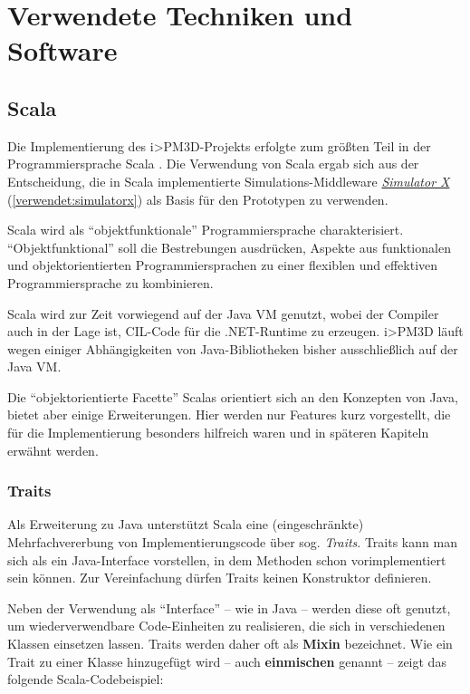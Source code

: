 \documentclass[a4paper,10pt]{sphinxmanual}
\begin{document}
\chapter{Verwendete Techniken und Software}
\label{verwendet::doc}\label{verwendet:verwendete-techniken-und-software}

\section{Scala}
\label{verwendet:scala}
Die Implementierung des i\textgreater{}PM3D-Projekts erfolgte zum größten Teil in der Programmiersprache Scala \cite{odersky_programming_2011} \cite{www:scala}.
Die Verwendung von Scala ergab sich aus der Entscheidung, die in Scala implementierte Simulations-Middleware {\hyperref[verwendet:simulatorx]{\emph{Simulator X}}} (\autoref*{verwendet:simulatorx}) als Basis für den Prototypen zu verwenden.

Scala wird als "`objektfunktionale"' Programmiersprache charakterisiert.
"`Objektfunktional"' soll die Bestrebungen ausdrücken, Aspekte aus funktionalen und objektorientierten Programmiersprachen zu einer flexiblen und effektiven Programmiersprache zu kombinieren.

Scala wird zur Zeit vorwiegend auf der Java VM genutzt, wobei der Compiler auch in der Lage ist, CIL-Code für die .NET-Runtime zu erzeugen.
i\textgreater{}PM3D läuft wegen einiger Abhängigkeiten von Java-Bibliotheken bisher ausschließlich auf der Java VM.

Die "`objektorientierte Facette"' Scalas orientiert sich an den Konzepten von Java, bietet aber einige Erweiterungen.
Hier werden nur Features kurz vorgestellt, die für die Implementierung besonders hilfreich waren und in späteren Kapiteln erwähnt werden.


\subsection{Traits}
\label{verwendet:traits}\label{verwendet:id1}
Als Erweiterung zu Java unterstützt Scala eine (eingeschränkte) Mehrfachvererbung von Implementierungscode über sog. \emph{Traits}.
Traits kann man sich als ein Java-Interface vorstellen, in dem Methoden schon vorimplementiert sein können.
Zur Vereinfachung dürfen Traits keinen Konstruktor definieren.

Neben der Verwendung als "`Interface"' – wie in Java – werden diese oft genutzt, um wiederverwendbare Code-Einheiten zu realisieren, die sich in verschiedenen Klassen einsetzen lassen.
Traits werden daher oft als \textbf{Mixin} bezeichnet.
Wie ein Trait zu einer Klasse hinzugefügt wird – auch \textbf{einmischen} genannt – zeigt das folgende Scala-Codebeispiel:
\end{document}
